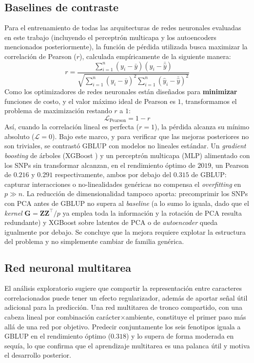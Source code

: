 \documentclass[conference]{IEEEtran}
\begin{document}
\subsection{Baselines de contraste}
Para el entrenamiento de todas las arquitecturas de redes neuronales evaluadas en este trabajo (incluyendo el perceptrón multicapa y los autoencoders mencionados posteriormente), la función de pérdida utilizada busca maximizar la correlación de Pearson ($r$), calculada empíricamente de la siguiente manera:
\begin{equation}
r = \frac{\sum_{i=1}^{n} (y_i - \bar{y})(\hat{y}_i - \bar{\hat{y}})}{\sqrt{\sum_{i=1}^{n} (y_i - \bar{y})^2 \sum_{i=1}^{n} (\hat{y}_i - \bar{\hat{y}})^2}}
\end{equation}
Como los optimizadores de redes neuronales están diseñados para \textbf{minimizar} funciones de costo, y el valor máximo ideal de Pearson es $1$, transformamos el problema de maximización restando $r$ a $1$:
\begin{equation}
\mathcal{L}_{\text{Pearson}} = 1 - r
\end{equation}
Así, cuando la correlación lineal es perfecta ($r = 1$), la pérdida alcanza su mínimo absoluto ($\mathcal{L} = 0$). 
Bajo este marco, y para verificar que las mejoras posteriores no son triviales, se contrastó GBLUP con modelos no lineales estándar. Un \textit{gradient boosting} de árboles (XGBoost \cite{chen2016}) y un perceptrón multicapa (MLP) alimentado con los SNPs sin transformar alcanzan, en el rendimiento óptimo de $2019$, un Pearson de $0.216$ y $0.291$ respectivamente, ambos por debajo del $0.315$ de GBLUP: capturar interacciones o no-linealidades genéricas no compensa el \textit{overfitting} en $p\gg n$. La reducción de dimensionalidad tampoco aporta: precomprimir los SNPs con PCA antes de GBLUP no supera al \textit{baseline} (a lo sumo lo iguala, dado que el \textit{kernel} $\mathbf{G}=\mathbf{Z}\mathbf{Z}^\top/p$ ya emplea toda la información y la rotación de PCA resulta redundante) y XGBoost sobre latentes de PCA o de \textit{autoencoder} queda igualmente por debajo. Se concluye que la mejora requiere explotar la estructura del problema y no simplemente cambiar de familia genérica.

\subsection{Red neuronal multitarea}
El análisis exploratorio sugiere que compartir la representación entre caracteres correlacionados puede tener un efecto regularizador, además de aportar señal útil adicional para la predicción. Una red multitarea de tronco compartido, con una cabeza lineal por combinación carácter$\times$ambiente, constituye el primer paso más allá de una red por objetivo. Predecir conjuntamente los seis fenotipos iguala a GBLUP en el rendimiento óptimo ($0.318$) y lo supera de forma moderada en sequía, lo que confirma que el aprendizaje multitarea es una palanca útil y motiva el desarrollo posterior.
\end{document}
